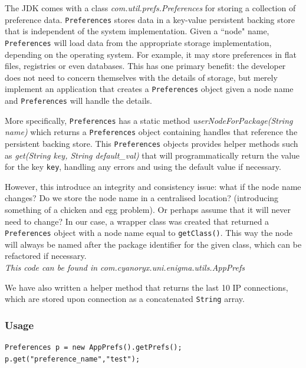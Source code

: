   The JDK comes with a class \emph{com.util.prefs.Preferences} for storing a collection of preference data. \verb!Preferences! stores data in a key-value persistent backing store that is independent of the system implementation. Given a ``node" name, \verb!Preferences! will load data from the appropriate storage implementation, depending on the operating system. For example, it may store preferences in flat files, registries or even databases. This has one primary benefit: the developer does not need to concern themselves with the details of storage, but merely implement an application that creates a \verb!Preferences! object given a node name and \verb!Preferences! will handle the details.
  
  More specifically, \verb!Preferences! has a static method \emph{userNodeForPackage(String name)} which returns a \verb!Preferences! object containing handles that reference the persistent backing store. This \verb!Preferences! objects provides helper methods such as \emph{get(String key, String default\_val)} that will programmatically return the value for the key \verb!key!, handling any errors and using the default value if necessary. 
  
  However, this introduce an integrity and consistency issue: what if the node name changes? Do we store the node name in a centralised location? (introducing something of a chicken and egg problem). Or perhaps assume that it will never need to change? In our case, a wrapper class was created that returned a \verb!Preferences! object with a node name equal to \verb!getClass()!. This way the node will always be named after the package identifier for the given class, which can be refactored if necessary. \\
  
  
  
  \emph{This code can be found in com.cyanoryx.uni.enigma.utils.AppPrefs}
  
  We have also written a helper method that returns the last 10 IP connections, which are stored upon connection as a concatenated \verb!String! array.
  
    \subsubsection{Usage}
    
    \begin{lstlisting}
Preferences p = new AppPrefs().getPrefs();
p.get("preference_name","test");
\end{lstlisting}
  
